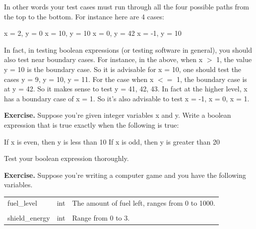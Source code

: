 {{{{{{

In other words your test cases must run through all the four possible
paths from the top to the bottom. For instance here are 4 cases:

\begin{tightlist}
\li x = 2, y = 0
\li x = 10, y = 10
\li x = 0, y = 42
\li x = -1, y = 10
\end{tightlist}

In fact, in testing boolean expressions (or testing software in general),
you should also test near boundary cases. For instance, in the above,
when x $>$ 1, the value y = 10 is the boundary case. So it is advisable for x
= 10, one should test the cases y = 9, y = 10, y = 11. For the case when
x $<=$ 1, the boundary case is at y = 42. So it makes sense to test y = 41,
42, 43. In fact at the higher level, x has a boundary case of x = 1. So it's
also advisable to test x = -1, x = 0, x = 1.


\textbf{Exercise.} Suppose you're given integer variables x and y. Write a
boolean expression that is true exactly when the following is true:
\begin{tightlist}
\li If x is even, then y is less than 10
\li If x is odd, then y is greater than 20
\end{tightlist}
Test your boolean expression thoroughly.

\textbf{Exercise.} Suppose you're writing a computer game and you have the
following variables.

\begin{tabular}{p{4cm} p{2cm} p{5cm}}
  fuel\_level & int & The amount of fuel left, ranges from 0 to 1000.\\

  & &\\ 
  
  shield\_energy & int & Range from 0 to 3.\\


\end{tabular}}}}}}}
